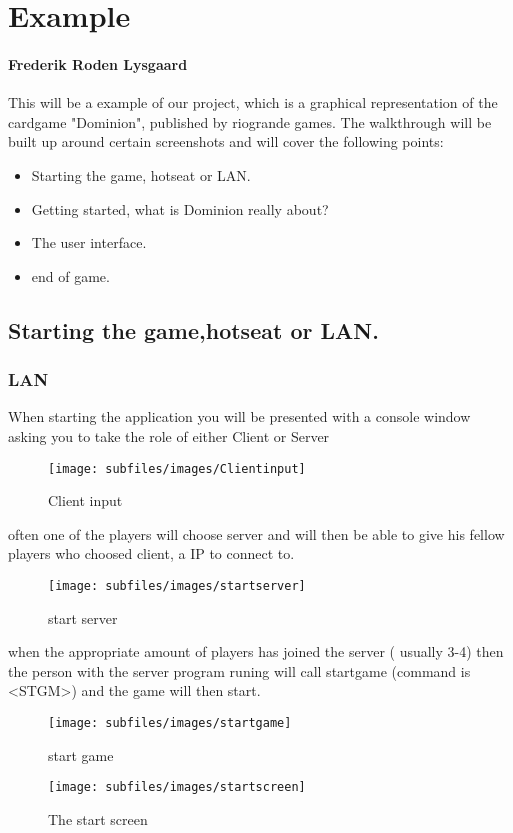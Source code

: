 \section{Example}
\paragraph{Frederik Roden Lysgaard}
This will be a example of our project, which is a graphical representation of the cardgame "Dominion", published by riogrande games.
The walkthrough will be built up around certain screenshots and will cover the following points:

\begin{itemize}
\item Starting the game, hotseat or LAN.
\item Getting started, what is Dominion really about?
\item The user interface.
\item end of game.
\end{itemize}

\subsection{Starting the game,hotseat or LAN.}
\subsubsection{LAN}
When starting the application you will be presented with a console window asking you to take the role of either Client or Server

\begin{figure}[h!]
\centering
\texttt{[image: subfiles/images/Clientinput]}
\caption{Client input}
\end{figure}

often one of the players will choose server and will then be able to give his fellow players who choosed client, a IP to connect to.
\begin{figure}[h!]
\centering
\texttt{[image: subfiles/images/startserver]}
\caption{start server}
\end{figure}
when the appropriate amount of players has joined the server ( usually 3-4) then the person with the server program runing will
call startgame (command is \textless STGM\textgreater ) and the game will then start.
\begin{figure}[h!]
\centering
\texttt{[image: subfiles/images/startgame]}
\caption{start game}
\end{figure}
\begin{figure}[h!]
\centering
\texttt{[image: subfiles/images/startscreen]}
\caption{The start screen}
\end{figure}
